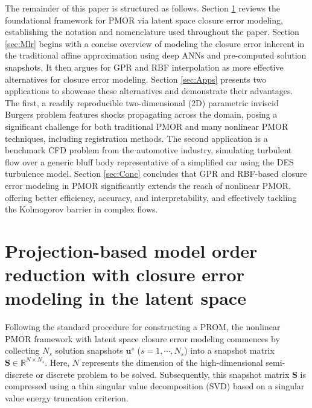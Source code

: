 \documentclass[preprint,10pt]{elsarticle}
\begin{document}
The remainder of this paper is structured as follows. Section \ref{sec:Ct} reviews the foundational framework for PMOR via latent space closure error modeling, establishing the 
notation and nomenclature used throughout the paper. Section \ref{sec:Mlr} begins with a concise overview of modeling the closure error inherent in the traditional affine 
approximation using deep ANNs and pre-computed solution snapshots. It then argues for GPR and RBF interpolation as more effective alternatives for closure error modeling.
Section \ref{sec:Apps} presents two applications to showcase these alternatives and demonstrate their advantages. The first, a readily reproducible two-dimensional (2D) parametric
inviscid Burgers problem features shocks propagating across the domain, posing a significant challenge for both traditional PMOR and many nonlinear PMOR techniques, including 
registration methods. The second application is a benchmark CFD problem from the automotive industry, simulating turbulent flow over a generic bluff body representative of a 
simplified car using the DES turbulence model. Section \ref{sec:Conc} concludes that GPR and RBF-based closure error modeling in PMOR significantly extends the reach of nonlinear 
PMOR, offering better efficiency, accuracy, and interpretability, and effectively tackling the Kolmogorov barrier in complex flows.

\section{Projection-based model order reduction with closure error modeling in the latent space}
\label{sec:Ct}

Following the standard procedure for constructing a PROM, the nonlinear PMOR framework with latent space closure error modeling commences by collecting $N_s$ solution snapshots ${\mathbf u}^{s}$ ($s = 1, \cdots, N_s$) into a snapshot matrix $\mathbf{S} \in \mathbb{R}^{N \times N_s}$. Here, $N$ represents 
the dimension of the high-dimensional semi-discrete or discrete problem to be solved. Subsequently, this snapshot matrix $\mathbf{S}$ is compressed using a thin singular value decomposition (SVD) based on a singular value energy truncation criterion.
\end{document}
